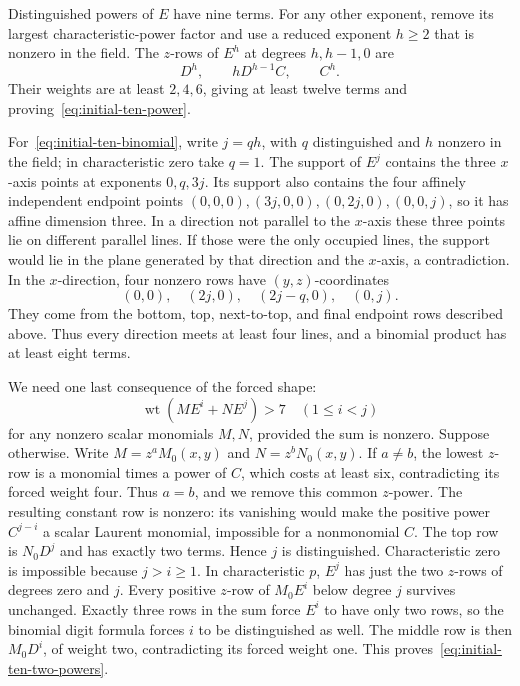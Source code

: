 \documentclass[11pt]{article}
\DeclareMathOperator{\wt}{wt}\DeclareMathOperator{\ord}{ord}
\numberwithin{equation}{section}
\theoremstyle{definition}\newtheorem{definition}[theorem]{Definition}
\theoremstyle{remark}\newtheorem{remark}[theorem]{Remark}
\begin{document}
Distinguished powers of $E$ have nine terms.  For any other exponent,
remove its largest characteristic-power factor and use a reduced
exponent $h\geq2$ that is nonzero in the field.  The $z$-rows of $E^h$
at degrees $h,h-1,0$ are
\[
 D^h,\qquad hD^{h-1}C,\qquad C^h.
\]
Their weights are at least $2,4,6$, giving at least twelve terms and
proving~\eqref{eq:initial-ten-power}.

For~\eqref{eq:initial-ten-binomial}, write $j=qh$, with $q$
distinguished and $h$ nonzero in the field; in characteristic zero take
$q=1$.  The support of $E^j$ contains the three $x$-axis points at
exponents $0,q,3j$.  Its support also contains the four affinely independent endpoint
points $(0,0,0),(3j,0,0),(0,2j,0),(0,0,j)$, so it has affine
dimension three.  In a direction
not parallel to the $x$-axis these three points lie on different
parallel lines.  If those were the only occupied lines, the support
would lie in the plane generated by that direction and the $x$-axis,
a contradiction.  In the $x$-direction, four nonzero rows have
$(y,z)$-coordinates
\[
 (0,0),\quad(2j,0),\quad(2j-q,0),\quad(0,j).
\]
They come from the bottom, top, next-to-top, and final endpoint rows
described above.  Thus every direction meets at least four lines,
and a binomial product has at least eight terms.

We need one last consequence of the forced shape:
\begin{equation}\label{eq:initial-ten-two-powers}
 \wt(ME^i+NE^j)>7
 \quad(1\leq i<j)
\end{equation}
for any nonzero scalar monomials $M,N$, provided the sum is nonzero.
Suppose otherwise.  Write $M=z^aM_0(x,y)$ and $N=z^bN_0(x,y)$.
If $a\ne b$, the lowest $z$-row is a monomial times a power of $C$,
which costs at least six, contradicting its forced weight four.
Thus $a=b$, and we remove this common $z$-power.  The resulting
constant row is nonzero: its vanishing would make the positive power
$C^{j-i}$ a scalar Laurent monomial, impossible for a nonmonomial
$C$.  The top row is $N_0D^j$ and has exactly two terms.  Hence $j$ is
distinguished.  Characteristic zero is impossible because $j>i\geq1$.
In characteristic $p$, $E^j$ has just the two $z$-rows of degrees zero
and $j$.  Every positive $z$-row of $M_0E^i$ below degree $j$ survives
unchanged.  Exactly three rows in the sum force $E^i$ to have only two
rows, so the binomial digit formula forces $i$ to be distinguished as
well.  The middle row is then $M_0D^i$, of weight two, contradicting
its forced weight one.  This proves~\eqref{eq:initial-ten-two-powers}.
\end{document}
